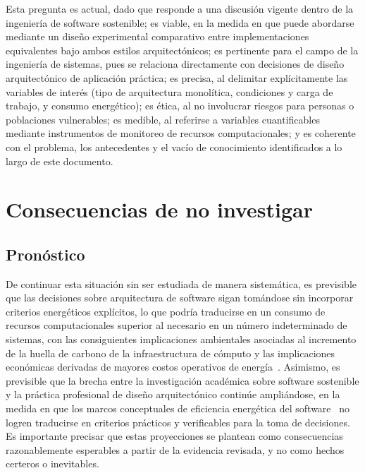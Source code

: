 Esta pregunta es actual, dado que responde a una discusión vigente dentro de la ingeniería de software sostenible; es viable, en la medida en que puede abordarse mediante un diseño experimental comparativo entre implementaciones equivalentes bajo ambos estilos arquitectónicos; es pertinente para el campo de la ingeniería de sistemas, pues se relaciona directamente con decisiones de diseño arquitectónico de aplicación práctica; es precisa, al delimitar explícitamente las variables de interés (tipo de arquitectura monolítica, condiciones y carga de trabajo, y consumo energético); es ética, al no involucrar riesgos para personas o poblaciones vulnerables; es medible, al referirse a variables cuantificables mediante instrumentos de monitoreo de recursos computacionales; y es coherente con el problema, los antecedentes y el vacío de conocimiento identificados a lo largo de este documento.

\section{Consecuencias de no investigar}
\label{sec:consecuencias}

\subsection{Pronóstico}
\label{sec:pronostico}

De continuar esta situación sin ser estudiada de manera sistemática, es previsible que las decisiones sobre arquitectura de software sigan tomándose sin incorporar criterios energéticos explícitos, lo que podría traducirse en un consumo de recursos computacionales superior al necesario en un número indeterminado de sistemas, con las consiguientes implicaciones ambientales asociadas al incremento de la huella de carbono de la infraestructura de cómputo y las implicaciones económicas derivadas de mayores costos operativos de energía~\cite{marimuthu2017green}. Asimismo, es previsible que la brecha entre la investigación académica sobre software sostenible y la práctica profesional de diseño arquitectónico continúe ampliándose, en la medida en que los marcos conceptuales de eficiencia energética del software~\cite{kern2018sustainable,kipp2011green,kipp2012layered} no logren traducirse en criterios prácticos y verificables para la toma de decisiones. Es importante precisar que estas proyecciones se plantean como consecuencias razonablemente esperables a partir de la evidencia revisada, y no como hechos certeros o inevitables.

